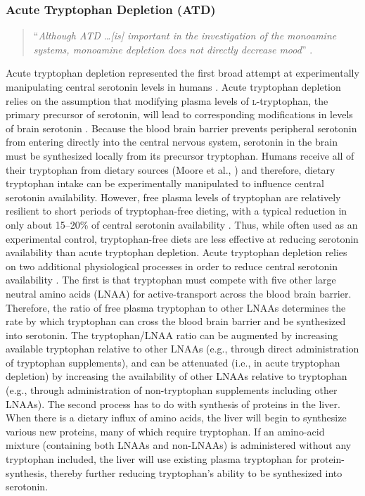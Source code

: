 
\subsubsection{Acute Tryptophan Depletion (ATD)}  
\begin{quotation}\noindent 
``\emph{Although ATD \ldots [is] important in the investigation of the monoamine systems, monoamine depletion does not directly decrease mood}'' \parencite{Ruhe2007}.\end{quotation}


\indent Acute tryptophan depletion represented the first broad attempt at experimentally manipulating central serotonin levels in humans \parencite{Young1985}. Acute tryptophan depletion relies on the assumption that modifying plasma levels of  \textsc{l}-tryptophan, the primary precursor of serotonin, will lead to corresponding  modifications in levels of brain serotonin \parencite{Hood05}. Because the blood brain barrier prevents peripheral serotonin from entering directly into the central nervous system, serotonin in the brain must be synthesized locally from its precursor tryptophan. Humans receive all of their tryptophan from dietary sources (Moore et al., \citeyear{Moore2000}) and therefore, dietary tryptophan intake can be experimentally manipulated to influence central serotonin availability. However, free plasma levels of tryptophan are relatively resilient to short periods of tryptophan-free dieting, with a typical reduction in only about 15--20\% of central serotonin availability \parencite{Delgado89}. Thus, while often used as an experimental control, tryptophan-free diets are less effective at reducing serotonin availability than acute tryptophan depletion. Acute tryptophan depletion relies on two additional physiological processes in order to reduce central serotonin availability \parencite[for an overview of the rationale and methodology of acute tryptophan depletion, see][]{Hood05}. The first is that tryptophan must compete with five other large neutral amino acids (LNAA) for active-transport across the blood brain barrier. Therefore, the ratio of free plasma tryptophan to other LNAAs determines the rate by which tryptophan can cross the blood brain barrier and be synthesized into serotonin. The tryptophan/LNAA ratio can be augmented by increasing available tryptophan relative to other LNAAs (e.g., through direct administration of tryptophan supplements), and can be attenuated (i.e., in acute tryptophan depletion) by increasing the availability of other LNAAs relative to tryptophan (e.g., through administration of non-tryptophan supplements including other LNAAs). The second process has to do with synthesis of proteins in the liver. When there is a dietary influx of amino acids, the liver will begin to synthesize various new proteins, many of which require tryptophan. If an amino-acid mixture (containing both LNAAs and non-LNAAs) is administered without any tryptophan included, the liver will use existing plasma tryptophan for protein-synthesis, thereby further reducing tryptophan's ability to be synthesized into serotonin.


